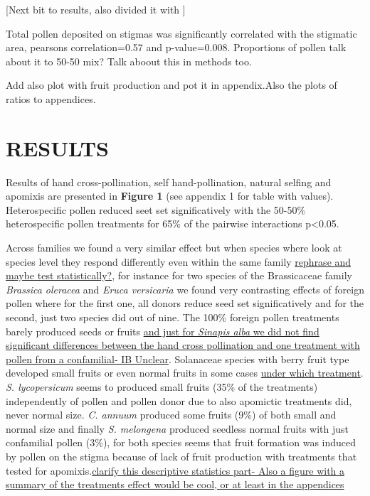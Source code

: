 \documentclass[11pt,a4paper]{article}
\begin{document}
{[}Next bit to results, also divided it with {]}

Total pollen deposited on stigmas was significantly correlated with the
stigmatic area, pearsons correlation=0.57 and p-value=0.008. Proportions
of pollen talk about it to 50-50 mix? Talk aboout this in methods too.

Add also plot with fruit production and pot it in appendix.Also the
plots of ratios to appendices.

\section{RESULTS}\label{results}

Results of hand cross-pollination, self hand-pollination, natural
selfing and apomixis are presented in \textbf{Figure 1} (see appendix 1
for table with values). Heterospecific pollen reduced seet set
significatively with the 50-50\% heterospecific pollen treatments for
65\% of the pairwise interactions p\textless{}0.05.

Across families we found a very similar effect but when species where
look at species level they respond differently even within the same
family \href{}{rephrase and maybe test statistically?}, for instance for
two species of the Brassicaceae family \emph{Brassica oleracea} and
\emph{Eruca versicaria} we found very contrasting effects of foreign
pollen where for the first one, all donors reduce seed set
significatively and for the second, just two species did out of nine.
The 100\% foreign pollen treatments barely produced seeds or fruits
\href{}{and just for \emph{Sinapis alba} we did not find significant
differences between the hand cross pollination and one treatment with
pollen from a confamilial- IB Unclear}. Solanaceae species with berry
fruit type developed small fruits or even normal fruits in some cases
\href{}{under which treatment}. \emph{S. lycopersicum} seems to produced
small fruits (35\% of the treatments) independently of pollen and pollen
donor due to also apomictic treatments did, never normal size. \emph{C.
annuum} produced some fruits (9\%) of both small and normal size and
finally \emph{S. melongena} produced seedless normal fruits with just
confamilial pollen (3\%), for both species seems that fruit formation
was induced by pollen on the stigma because of lack of fruit production
with treatments that tested for apomixis.\href{}{clarify this
descriptive statistics part- Also a figure with a summary of the
treatments effect would be cool, or at least in the appendices}
\end{document}

